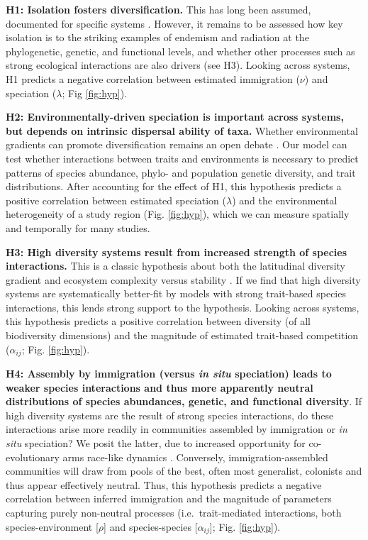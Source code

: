 \documentclass[11pt]{article}
\begin{document}
\textbf{H1: Isolation fosters diversification.} This has long been
assumed, documented for specific systems \cite{Losos2000-xp,
  Wagner2014-qm, Rosindell2011-od}. However, it remains to be assessed
how key isolation is to the striking examples of endemism and
radiation at the phylogenetic, genetic, and functional levels, and
whether other processes such as strong ecological interactions are
also drivers (see H3). Looking across systems, H1 predicts a negative
correlation between estimated immigration ($\nu$) and speciation
($\lambda$; Fig \ref{fig:hyp}).

\textbf{H2: Environmentally-driven speciation is important across
  systems, but depends on intrinsic dispersal ability of taxa.}
Whether environmental gradients can promote diversification remains an
open debate \cite{Mittelbach2007-ui, Ogden2002-jb, Rundle2005-ll}. Our
model can test whether interactions between traits and environments is
necessary to predict patterns of species abundance, phylo- and
population genetic diversity, and trait distributions. After
accounting for the effect of H1, this hypothesis predicts a positive
correlation between estimated speciation ($\lambda$) and the
environmental heterogeneity of a study region (Fig. \ref{fig:hyp}),
which we can measure spatially and temporally for many studies.

\textbf{H3: High diversity systems result from increased strength of
  species interactions.} This is a classic hypothesis about both the
latitudinal diversity gradient \cite{Pianka1966-ky} and ecosystem
complexity versus stability \cite{May1973-ua, Nuismer2013-wd}. If we
find that high diversity systems are systematically better-fit by
models with strong trait-based species interactions, this lends strong
support to the hypothesis. Looking across systems, this hypothesis
predicts a positive correlation between diversity (of all biodiversity
dimensions) and the magnitude of estimated trait-based competition
($\alpha_{ij}$; Fig. \ref{fig:hyp}).

\textbf{H4: Assembly by immigration (versus \emph{in situ} speciation)
  leads to weaker species interactions and thus more apparently
  neutral distributions of species abundances, genetic, and functional
  diversity}.  If high diversity systems are the result of strong
species interactions, do these interactions arise more readily in
communities assembled by immigration or \emph{in situ} speciation? We
posit the latter, due to increased opportunity for co-evolutionary
arms race-like dynamics \cite{Quental2013-qv,
  ODwyer2014-gw}. Conversely, immigration-assembled communities will
draw from pools of the best, often most generalist, colonists and thus
appear effectively neutral. Thus, this hypothesis predicts a negative
correlation between inferred immigration and the magnitude of
parameters capturing purely non-neutral processes (i.e.~trait-mediated
interactions, both species-environment {[}$\rho${]} and
species-species {[}$\alpha_{ij}${]}; Fig.  \ref{fig:hyp}).
\end{document}
